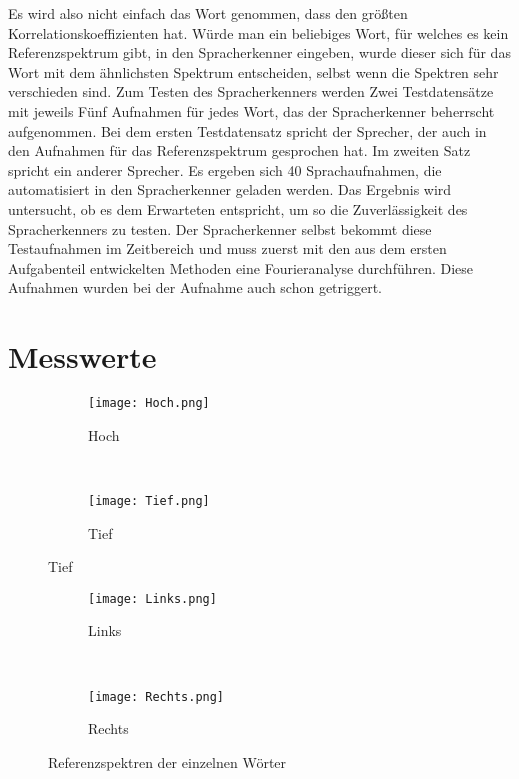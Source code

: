 Es wird also nicht einfach das Wort genommen, dass den größten Korrelationskoeffizienten hat. Würde man ein beliebiges Wort, für welches es kein Referenzspektrum gibt, in den Spracherkenner eingeben, wurde dieser sich für das Wort mit dem ähnlichsten Spektrum entscheiden, selbst wenn die Spektren sehr verschieden sind.
Zum Testen des Spracherkenners werden Zwei Testdatensätze mit jeweils Fünf Aufnahmen für jedes Wort, das der Spracherkenner beherrscht aufgenommen. Bei dem ersten Testdatensatz spricht der Sprecher, der auch in den Aufnahmen für das Referenzspektrum gesprochen hat.
Im zweiten Satz spricht ein anderer Sprecher. Es ergeben sich 40 Sprachaufnahmen, die automatisiert in den Spracherkenner geladen werden. Das Ergebnis wird untersucht, ob es dem Erwarteten entspricht, um so die Zuverlässigkeit des Spracherkenners zu testen.
Der Spracherkenner selbst bekommt diese Testaufnahmen im Zeitbereich und muss zuerst mit den aus dem ersten Aufgabenteil entwickelten Methoden eine Fourieranalyse durchführen. Diese Aufnahmen wurden bei der Aufnahme auch schon getriggert.
\newpage
\section{Messwerte}
\label{chap:VERSUCH_2_MESSWERTE}
\begin{figure}[H]
    \centering
    \begin{subfigure}[b]{0.49\textwidth}
        \texttt{[image: Hoch.png]}
        \caption{Hoch}
        \label{fig:Hoch}
    \end{subfigure}
    ~ %
    \begin{subfigure}[b]{0.49\textwidth}
        \texttt{[image: Tief.png]}
        \caption{Tief}
        \label{fig:Tief}
    \end{subfigure}
\end{figure}

\begin{figure}[H]
    \centering
    \begin{subfigure}[b]{0.49\textwidth}        			\texttt{[image: Links.png]}
    	\caption{Links}
        \label{fig:Links}
    \end{subfigure}
    ~
    \begin{subfigure}[b]{0.49\textwidth}        		   \texttt{[image: Rechts.png]}
       \caption{Rechts}
       \label{fig:Rechts}
    \end{subfigure}
\caption{Referenzspektren der einzelnen Wörter}
\label{fig:RefSpektren}
\end{figure}

